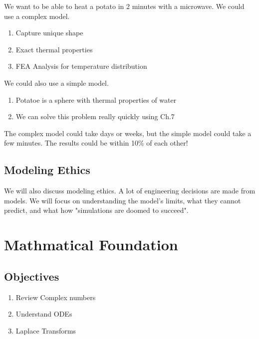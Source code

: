 \documentclass[12pt, a4paper]{report}
\begin{document}
  We want to be able to heat a potato in 2 minutes with a microwave. We could use a complex model.

  \begin{enumerate}
    \item Capture unique shape
    \item Exact thermal properties
    \item FEA Analysis for temperature distribution
  \end{enumerate}

  We could also use a simple model.

  \begin{enumerate}
    \item Potatoe is a sphere with thermal properties of water
    \item We can solve this problem really quickly using Ch.7
  \end{enumerate}

  The complex model could take days or weeks, but the simple model could take a few minutes. The results could be within 10\% of each other!

  \section{Modeling Ethics}

  We will also discuss modeling ethics. A lot of engineering decisions are made from models. We will focus on understanding the model's limits, what they cannot predict, and what how "simulations are doomed to succeed".








  \chapter{Mathmatical Foundation}

  \section{Objectives}

  \begin{enumerate}
    \item Review Complex numbers
    \item Understand ODEs
    \item Laplace Transforms
  \end{enumerate}
\end{document}
